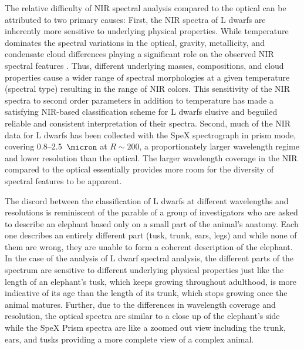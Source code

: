 \documentclass[12pt,preprint]{aastex}
\begin{document}
The relative difficulty of NIR spectral analysis compared to the optical can be attributed to two primary causes:
First, the NIR spectra of L dwarfs are inherently more sensitive to underlying physical properties.
While temperature dominates the spectral variations in the optical, gravity, metallicity, and condensate cloud differences playing a significant role on the observed NIR spectral features \citep{Knapp04}.
Thus, different underlying masses, compositions, and cloud properties cause a wider range of spectral morphologies at a given temperature (spectral type) resulting in the range of NIR colors.
This sensitivity of the NIR spectra to second order parameters in addition to temperature has made a satisfying NIR-based classification scheme for L dwarfs elusive and beguiled reliable and consistent interpretation of their spectra.
Second, much of the NIR data for L dwarfs has been collected with the SpeX spectrograph in prism mode, covering 0.8--2.5~$\micron$ at $R\sim200$, a proportionately larger wavelength regime and lower resolution than the optical.
The larger wavelength coverage in the NIR compared to the optical essentially provides more room for the diversity of spectral features to be apparent.

The discord between the classification of L dwarfs at different wavelengths and resolutions is reminiscent of the parable of a group of investigators who are asked to describe an elephant based only on a small part of the animal's anatomy.
Each one describes an entirely different part (tusk, trunk, ears, legs) and while none of them are wrong, they are unable to form a coherent description of the elephant.
In the case of the analysis of L dwarf spectral analysis, the different parts of the spectrum are sensitive to different underlying physical properties just like the length of an elephant's tusk, which keeps growing throughout adulthood, is more indicative of its age than the length of its trunk, which stops growing once the animal matures.
Further, due to the differences in wavelength coverage and resolution, the optical spectra are similar to a close up of the elephant's side while the SpeX Prism spectra are like a zoomed out view including the trunk, ears, and tusks providing a more complete view of a complex animal.
\end{document}
